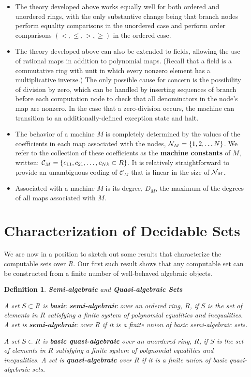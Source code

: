 \documentclass[twoside]{article}
\newtheorem{definition}{Definition}[section]
\begin{document}
\begin{itemize}
\item The theory developed above works equally well for both ordered
  and unordered rings, with the only substantive change being that
  branch nodes perform equality comparisons in the unordered case and
  perform order comparisons $(<, \leq, >, \geq)$ in the ordered case.

\item The theory developed above can also be extended to fields,
  allowing the use of rational maps in addition to polynomial maps.
  (Recall that a field is a commutative ring with unit in which every
  nonzero element has a multiplicative inverse.)  The only possible
  cause for concern is the possibility of division by zero, which can
  be handled by inserting sequences of branch before each computation
  node to check that all denominators in the node's map are nonzero.
  In the case that a zero-division occurs, the machine can transition
  to an additionally-defined exception state and halt.

\item The behavior of a machine $M$ is completely determined by the
  values of the coefficients in each map associated with the nodes,
  $\mathcal{N}_M = \{1, 2, \ldots N\}$.  We refer to the collection of
  these coefficients as the \textbf{machine constants} of $M$,
  written: $\mathcal{C}_M = \{c_{11}, c_{21}, \ldots, c_{Nk}
    \subset R\}$.  It is relatively straightforward to provide an
  unambiguous coding of $\mathcal{C}_M$ that is linear in the size of
  $\mathcal{N}_M$.

\item Associated with a machine $M$ is its degree, $D_M$, the maximum
  of the degrees of all maps associated with $M$.
\end{itemize}

\section{Characterization of Decidable Sets}

  We are now in a position to sketch out some results that
  characterize the computable sets over $R$.  Our first such result
  shows that any computable set can be constructed from a finite number
  of well-behaved algebraic objects.

  \begin{definition}{\textbf{Semi-algebraic} and \textbf{Quasi-algebraic Sets}}
    
    A set $S \subset R$ is \textbf{basic semi-algebraic} over an
    ordered ring, $R$, if $S$ is the set of elements in $R$ satisfying
    a finite system of polynomial equalities and inequalities. A set
    is \textbf{semi-algebraic} over $R$ if it is a finite union of basic
    semi-algebraic sets.

    A set $S \subset R$ is \textbf{basic quasi-algebraic} over an
    unordered ring, $R$, if $S$ is the set of elements in $R$ satisfying
    a finite system of polynomial equalities and inequalities. A set
    is \textbf{quasi-algebraic} over $R$ if it is a finite union of basic
    quasi-algebraic sets.
    
  \end{definition}
\end{document}
